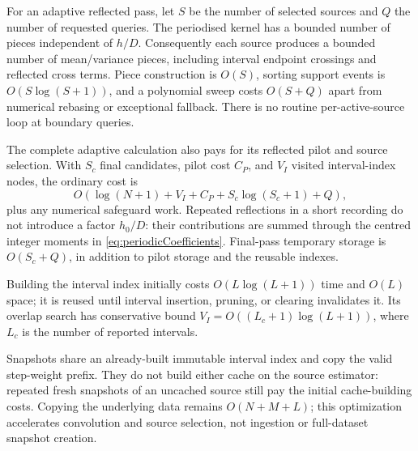 \documentclass[11pt,a4paper]{article}
\begin{document}
For an adaptive reflected pass, let $S$ be the number of selected
sources and $Q$ the number of requested queries.  The periodised kernel
has a bounded number of pieces independent of $h/D$.  Consequently each
source produces a bounded number of mean/variance pieces, including
interval endpoint crossings and reflected cross terms.  Piece construction
is $O(S)$, sorting support events is $O(S\log(S+1))$, and a polynomial sweep
costs $O(S+Q)$ apart from numerical rebasing or exceptional fallback.
There is no routine per-active-source loop at boundary queries.

The complete adaptive calculation also pays for its reflected pilot and
source selection.  With $S_c$ final candidates, pilot cost $C_P$, and
$V_I$ visited interval-index nodes, the ordinary cost is
\begin{equation}
 O\!\left(\log(N+1)+V_I+C_P+S_c\log(S_c+1)+Q\right),
\end{equation}
plus any numerical safeguard work.  Repeated reflections in a short
recording do not introduce a factor $h_0/D$: their contributions are
summed through the centred integer moments in
\eqref{eq:periodicCoefficients}.  Final-pass temporary storage is
$O(S_c+Q)$, in addition to pilot storage and the reusable indexes.

Building the interval index initially costs $O(L\log(L+1))$ time and
$O(L)$ space; it is reused until interval insertion, pruning, or clearing
invalidates it.  Its overlap search has conservative bound
$V_I=O((L_c+1)\log(L+1))$, where $L_c$ is the number of reported intervals.

Snapshots share an already-built immutable interval index and copy the
valid step-weight prefix.  They do not build either cache on the source
estimator: repeated fresh snapshots of an uncached source still pay the
initial cache-building costs.  Copying the underlying data remains
$O(N+M+L)$; this optimization accelerates convolution and source selection,
not ingestion or full-dataset snapshot creation.
\end{document}
